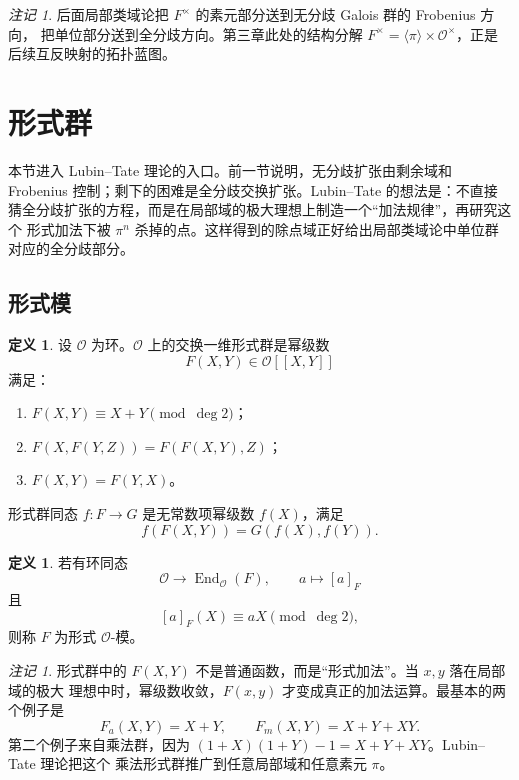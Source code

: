 \documentclass[11pt,a4paper,openany]{ctexbook}
\numberwithin{equation}{chapter}
\theoremstyle{plain}
\theoremstyle{definition}
\newtheorem{definition}[theorem]{定义}
\theoremstyle{remark}
\newtheorem{remark}[theorem]{注记}
\begin{document}
\begin{remark}
后面局部类域论把 $F^\times$ 的素元部分送到无分歧 Galois 群的 Frobenius 方向，
把单位部分送到全分歧方向。第三章此处的结构分解
$F^\times=\langle\pi\rangle\times\mathcal O^\times$，正是后续互反映射的拓扑蓝图。
\end{remark}

\section{形式群}

本节进入 Lubin--Tate 理论的入口。前一节说明，无分歧扩张由剩余域和
Frobenius 控制；剩下的困难是全分歧交换扩张。Lubin--Tate 的想法是：不直接
猜全分歧扩张的方程，而是在局部域的极大理想上制造一个“加法规律”，再研究这个
形式加法下被 $\pi^n$ 杀掉的点。这样得到的除点域正好给出局部类域论中单位群
对应的全分歧部分。

\subsection{形式模}

\begin{definition}
设 $\mathcal O$ 为环。$\mathcal O$ 上的交换一维形式群是幂级数
\[
F(X,Y)\in\mathcal O[[X,Y]]
\]
满足：
\begin{enumerate}[label=(\arabic*)]
\item $F(X,Y)\equiv X+Y\pmod{\deg2}$；
\item $F(X,F(Y,Z))=F(F(X,Y),Z)$；
\item $F(X,Y)=F(Y,X)$。
\end{enumerate}
形式群同态 $f:F\to G$ 是无常数项幂级数 $f(X)$，满足
\[
f(F(X,Y))=G(f(X),f(Y)).
\]
\end{definition}

\begin{definition}
若有环同态
\[
\mathcal O\to\operatorname{End}_{\mathcal O}(F),\qquad a\mapsto [a]_F
\]
且
\[
[a]_F(X)\equiv aX\pmod{\deg2},
\]
则称 $F$ 为形式 $\mathcal O$-模。
\end{definition}

\begin{remark}
形式群中的 $F(X,Y)$ 不是普通函数，而是“形式加法”。当 $x,y$ 落在局部域的极大
理想中时，幂级数收敛，$F(x,y)$ 才变成真正的加法运算。最基本的两个例子是
\[
F_a(X,Y)=X+Y,\qquad F_m(X,Y)=X+Y+XY.
\]
第二个例子来自乘法群，因为 $(1+X)(1+Y)-1=X+Y+XY$。Lubin--Tate 理论把这个
乘法形式群推广到任意局部域和任意素元 $\pi$。
\end{remark}
\end{document}
